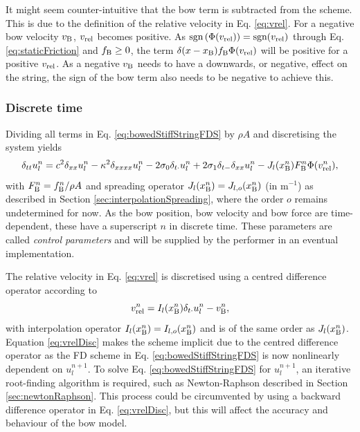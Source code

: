 It might seem counter-intuitive that the bow term is subtracted from the scheme. This is due to the definition of the relative velocity in Eq. \eqref{eq:vrel}. For a negative bow velocity $v_{\text{B}}$, $v_\text{rel}$ becomes positive. As $\text{sgn}\left(\Phi(v_\text{rel})\right) = \text{sgn}(v_\text{rel})$ through Eq. \eqref{eq:staticFriction} and $f_{\text{B}}\geq 0$, the term $\delta(x-x_{\text{B}})f_{\text{B}}\Phi(v_\text{rel})$ will be positive for a positive $v_\text{rel}$. As a negative $v_{\text{B}}$ needs to have a downwards, or negative, effect on the string, the sign of the bow term also needs to be negative to achieve this.  

\subsubsection{Discrete time}
Dividing all terms in Eq. \eqref{eq:bowedStiffStringFDS} by $\rho A$ and discretising the system yields
%
\begin{equation}\label{eq:bowedStiffStringFDS}
    \delta_{tt} u_l^n = c^2 \delta_{xx} u_l^n - \kappa^2 \delta_{xxxx} u_l^n - 2 \sigma_{0} \delta_{t\cdot} u_l^n + 2 \sigma_{1}\delta_{t-}\delta_{xx} u_l^n - J_l(x_{\text{B}}^n)F_{\text{B}}^n\Phi(v_\text{rel}^n),
\end{equation}
with $F_{\text{B}}^n = f_{\text{B}}^n/\rho A$ and spreading operator $J_l(x_{\text{B}}^n) = J_{l,o}(x_{\text{B}}^n)$ (in m$^{-1}$) as described in Section \ref{sec:interpolationSpreading}, where the order $o$ remains undetermined for now. As the bow position, bow velocity and bow force are time-dependent, these have a superscript $n$ in discrete time. These parameters are called \textit{control parameters} and will be supplied by the performer in an eventual implementation.

The relative velocity in Eq. \eqref{eq:vrel} is discretised using a centred difference operator according to
\begin{equation}\label{eq:vrelDisc}
    v_\text{rel}^n = I_l(x_{\text{B}}^n)\delta_{t\cdot} u_l^n - v_{\text{B}}^n,
\end{equation}
with interpolation operator $I_l(x_{\text{B}}^n) = I_{l,o}(x_{\text{B}}^n)$ and is of the same order as $J_l(x_{\text{B}}^n)$. Equation \eqref{eq:vrelDisc} makes the scheme implicit due to the centred difference operator as the FD scheme in Eq. \eqref{eq:bowedStiffStringFDS} is now nonlinearly dependent on $u_l^{n+1}$. To solve Eq. \eqref{eq:bowedStiffStringFDS} for $u_l^{n+1}$, an iterative root-finding algorithm is required, such as Newton-Raphson described in Section \ref{sec:newtonRaphson}. This process could be circumvented by using a backward difference operator in Eq. \eqref{eq:vrelDisc}, but this will affect the accuracy and behaviour of the bow model.

